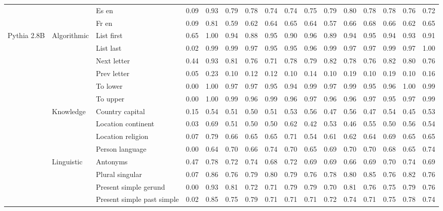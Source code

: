 \begin{center}
\begin{longtable}{lllrrrrrrrrrrrrr}
 &  & Es en & 0.09 & 0.93 & 0.79 & 0.78 & 0.74 & 0.74 & 0.75 & 0.79 & 0.80 & 0.78 & 0.78 & 0.76 & 0.72 \\
 &  & Fr en & 0.09 & 0.81 & 0.59 & 0.62 & 0.64 & 0.65 & 0.64 & 0.57 & 0.66 & 0.68 & 0.66 & 0.62 & 0.65 \\
\cline{1-16} \cline{2-16}
\multirow[t]{18}{*}{Pythia 2.8B} & \multirow[t]{6}{*}{Algorithmic} & List first & 0.65 & 1.00 & 0.94 & 0.88 & 0.95 & 0.90 & 0.96 & 0.89 & 0.94 & 0.95 & 0.94 & 0.93 & 0.91 \\
 &  & List last & 0.02 & 0.99 & 0.99 & 0.97 & 0.95 & 0.95 & 0.96 & 0.99 & 0.97 & 0.97 & 0.99 & 0.97 & 1.00 \\
 &  & Next letter & 0.44 & 0.93 & 0.81 & 0.76 & 0.71 & 0.78 & 0.79 & 0.82 & 0.78 & 0.76 & 0.82 & 0.80 & 0.76 \\
 &  & Prev letter & 0.05 & 0.23 & 0.10 & 0.12 & 0.12 & 0.10 & 0.14 & 0.10 & 0.19 & 0.10 & 0.19 & 0.10 & 0.16 \\
 &  & To lower & 0.00 & 1.00 & 0.97 & 0.97 & 0.95 & 0.94 & 0.99 & 0.97 & 0.99 & 0.95 & 0.96 & 1.00 & 0.99 \\
 &  & To upper & 0.00 & 1.00 & 0.99 & 0.96 & 0.99 & 0.96 & 0.97 & 0.96 & 0.96 & 0.97 & 0.95 & 0.97 & 0.99 \\
\cline{2-16}
 & \multirow[t]{4}{*}{Knowledge} & Country capital & 0.15 & 0.54 & 0.51 & 0.50 & 0.51 & 0.53 & 0.56 & 0.47 & 0.56 & 0.47 & 0.54 & 0.45 & 0.53 \\
 &  & Location continent & 0.03 & 0.69 & 0.51 & 0.50 & 0.50 & 0.62 & 0.42 & 0.53 & 0.46 & 0.55 & 0.50 & 0.56 & 0.54 \\
 &  & Location religion & 0.07 & 0.79 & 0.66 & 0.65 & 0.65 & 0.71 & 0.54 & 0.61 & 0.62 & 0.64 & 0.69 & 0.65 & 0.65 \\
 &  & Person language & 0.00 & 0.64 & 0.70 & 0.66 & 0.74 & 0.70 & 0.65 & 0.69 & 0.70 & 0.70 & 0.68 & 0.65 & 0.74 \\
\cline{2-16}
 & \multirow[t]{4}{*}{Linguistic} & Antonyms & 0.47 & 0.78 & 0.72 & 0.74 & 0.68 & 0.72 & 0.69 & 0.69 & 0.66 & 0.69 & 0.70 & 0.74 & 0.69 \\
 &  & Plural singular & 0.07 & 0.86 & 0.76 & 0.79 & 0.80 & 0.79 & 0.76 & 0.78 & 0.80 & 0.85 & 0.76 & 0.82 & 0.76 \\
 &  & Present simple gerund & 0.00 & 0.93 & 0.81 & 0.72 & 0.71 & 0.79 & 0.79 & 0.70 & 0.81 & 0.76 & 0.75 & 0.79 & 0.76 \\
 &  & Present simple past simple & 0.02 & 0.85 & 0.75 & 0.79 & 0.71 & 0.71 & 0.71 & 0.72 & 0.74 & 0.71 & 0.75 & 0.78 & 0.74 \\

\end{longtable}
\end{center}
